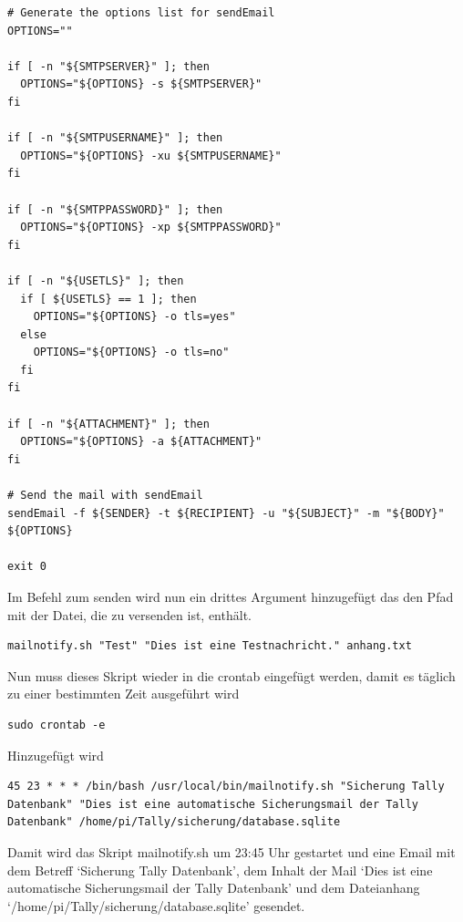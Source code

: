 \documentclass[11pt,a4paper]{article} %
\begin{document}
\begin{frame}
\begin{lstlisting}
# Generate the options list for sendEmail
OPTIONS=""

if [ -n "${SMTPSERVER}" ]; then
  OPTIONS="${OPTIONS} -s ${SMTPSERVER}"
fi

if [ -n "${SMTPUSERNAME}" ]; then
  OPTIONS="${OPTIONS} -xu ${SMTPUSERNAME}"
fi

if [ -n "${SMTPPASSWORD}" ]; then
  OPTIONS="${OPTIONS} -xp ${SMTPPASSWORD}"
fi

if [ -n "${USETLS}" ]; then
  if [ ${USETLS} == 1 ]; then
    OPTIONS="${OPTIONS} -o tls=yes"
  else
    OPTIONS="${OPTIONS} -o tls=no"
  fi
fi

if [ -n "${ATTACHMENT}" ]; then
  OPTIONS="${OPTIONS} -a ${ATTACHMENT}"
fi

# Send the mail with sendEmail
sendEmail -f ${SENDER} -t ${RECIPIENT} -u "${SUBJECT}" -m "${BODY}" ${OPTIONS}

exit 0
\end{lstlisting}
\end{frame}
Im Befehl zum senden wird nun ein drittes Argument hinzugefügt das den Pfad mit der Datei, die zu versenden ist, enthält.
\begin{frame}

\begin{lstlisting}
mailnotify.sh "Test" "Dies ist eine Testnachricht." anhang.txt

\end{lstlisting}
\end{frame}
\par
Nun muss dieses Skript wieder in die crontab eingefügt werden, damit es täglich zu einer bestimmten Zeit ausgeführt wird
\begin{frame}

\begin{lstlisting}
sudo crontab -e

\end{lstlisting}
\end{frame}
Hinzugefügt wird
\begin{frame}

\begin{lstlisting}
45 23 * * * /bin/bash /usr/local/bin/mailnotify.sh "Sicherung Tally Datenbank" "Dies ist eine automatische Sicherungsmail der Tally Datenbank" /home/pi/Tally/sicherung/database.sqlite

\end{lstlisting}
\end{frame}
Damit wird das Skript mailnotify.sh um 23:45 Uhr gestartet und eine Email mit dem Betreff `Sicherung Tally Datenbank', dem Inhalt der Mail `Dies ist eine automatische Sicherungsmail der Tally Datenbank' und dem Dateianhang `/home/pi/Tally/sicherung/database.sqlite' gesendet.
\end{document}
